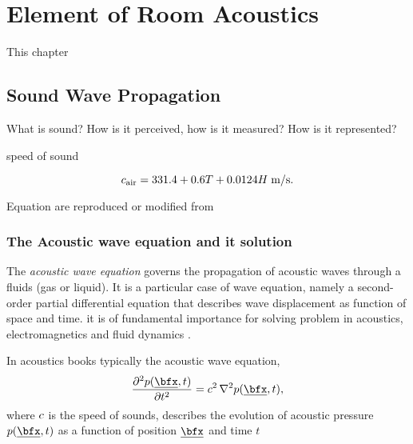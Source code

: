 \chapter{Element of Room Acoustics}\label{chap:acoustics}

 This chapter

\section{Sound Wave Propagation}
What is sound? How is it perceived, how is it measured? How is it represented?

speed of sound

\begin{equation}
    c_\text{air} =  331.4 + 0.6T + 0.0124H \; \text{m/s}
    .
\end{equation}

Equation are reproduced or modified from \cite{Kuttruff2009room, Marczuk2006modelling, Habets2010generator}

\subsection{The Acoustic wave equation and it solution}
\label{subsec:acoustics:waveq}
The \textit{acoustic wave equation} governs the propagation of acoustic waves through a fluids (gas or liquid).
It is a particular case of wave equation, namely a second-order partial differential equation that describes wave displacement as function of space and time.
it is of fundamental importance for solving problem in acoustics, electromagnetics and fluid dynamics
.

In acoustics books typically the acoustic wave equation,
\begin{equation}
    \label{eq:acoustics:wave}
    \kpderiv[2]{\pressure(\positionMicrophone, t)}{t} = \speedOfSound^2 \knabla^2 \pressure(\positionMicrophone, t)
    ,
\end{equation}
where $c$ is the speed of sounds, describes the evolution of acoustic pressure $\pressure(\positionMicrophone, t)$ as a function of position $\positionMicrophone$ and time $t$

